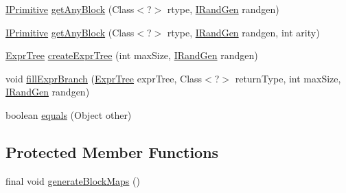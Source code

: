 \begin{DoxyCompactItemize}
\item 
\hyperlink{interfacenet_1_1sf_1_1jclec_1_1exprtree_1_1_i_primitive}{I\-Primitive} \hyperlink{classnet_1_1sf_1_1jclec_1_1exprtree_1_1_expr_tree_schema_aa1dd1be15d247f1433d9ee9efa69ec5e}{get\-Any\-Block} (Class$<$?$>$ rtype, \hyperlink{interfacenet_1_1sf_1_1jclec_1_1util_1_1random_1_1_i_rand_gen}{I\-Rand\-Gen} randgen)
\item 
\hyperlink{interfacenet_1_1sf_1_1jclec_1_1exprtree_1_1_i_primitive}{I\-Primitive} \hyperlink{classnet_1_1sf_1_1jclec_1_1exprtree_1_1_expr_tree_schema_acd7543c47aa831b8c5ef788fa986966c}{get\-Any\-Block} (Class$<$?$>$ rtype, \hyperlink{interfacenet_1_1sf_1_1jclec_1_1util_1_1random_1_1_i_rand_gen}{I\-Rand\-Gen} randgen, int arity)
\item 
\hyperlink{classnet_1_1sf_1_1jclec_1_1exprtree_1_1_expr_tree}{Expr\-Tree} \hyperlink{classnet_1_1sf_1_1jclec_1_1exprtree_1_1_expr_tree_schema_ac6746feb1a9f6a9f42732f2b3c73660f}{create\-Expr\-Tree} (int max\-Size, \hyperlink{interfacenet_1_1sf_1_1jclec_1_1util_1_1random_1_1_i_rand_gen}{I\-Rand\-Gen} randgen)
\item 
void \hyperlink{classnet_1_1sf_1_1jclec_1_1exprtree_1_1_expr_tree_schema_a77806eaca70bdd4913227aea16b61d1a}{fill\-Expr\-Branch} (\hyperlink{classnet_1_1sf_1_1jclec_1_1exprtree_1_1_expr_tree}{Expr\-Tree} expr\-Tree, Class$<$?$>$ return\-Type, int max\-Size, \hyperlink{interfacenet_1_1sf_1_1jclec_1_1util_1_1random_1_1_i_rand_gen}{I\-Rand\-Gen} randgen)
\item 
boolean \hyperlink{classnet_1_1sf_1_1jclec_1_1exprtree_1_1_expr_tree_schema_a05be85ca80f0ad730d8ac61827035378}{equals} (Object other)
\end{DoxyCompactItemize}
\subsection*{Protected Member Functions}
\begin{DoxyCompactItemize}
\item 
final void \hyperlink{classnet_1_1sf_1_1jclec_1_1exprtree_1_1_expr_tree_schema_a2022206293d7330f674d952255ff3867}{generate\-Block\-Maps} ()
\end{DoxyCompactItemize}
